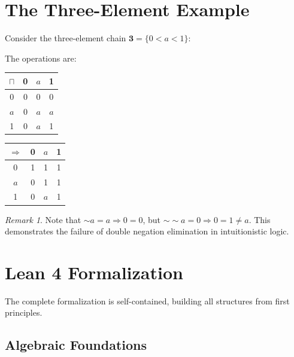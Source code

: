 \documentclass[12pt,a4paper]{article}
\theoremstyle{definition}
\theoremstyle{plain}
\theoremstyle{remark}
\newtheorem{observacao}[definicao]{Remark}
\begin{document}
\section{The Three-Element Example}

Consider the three-element chain $\mathbf{3} = \{0 < a < 1\}$:

\begin{center}
\end{center}

The operations are:
\begin{center}
\begin{tabular}{c|ccc}
    $\sqcap$ & 0 & $a$ & 1 \\
    \hline
    0 & 0 & 0 & 0 \\
    $a$ & 0 & $a$ & $a$ \\
    1 & 0 & $a$ & 1
\end{tabular}
\qquad
\begin{tabular}{c|ccc}
    $\Rightarrow$ & 0 & $a$ & 1 \\
    \hline
    0 & 1 & 1 & 1 \\
    $a$ & 0 & 1 & 1 \\
    1 & 0 & $a$ & 1
\end{tabular}
\end{center}

\begin{observacao}
Note that $\sim a = a \Rightarrow 0 = 0$, but $\sim\sim a = 0 \Rightarrow 0 = 1 \neq a$. This demonstrates the failure of double negation elimination in intuitionistic logic.
\end{observacao}

\section{Lean 4 Formalization}

The complete formalization is self-contained, building all structures from first principles.

\subsection{Algebraic Foundations}
\end{document}
